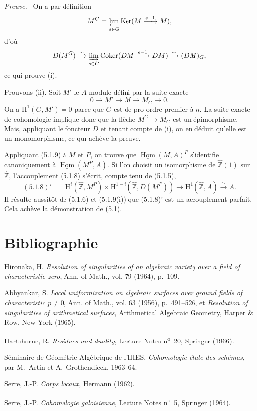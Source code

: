 \documentclass[11pt]{article}
\newenvironment{prooftext}[1][Proof]{\par\noindent\emph{#1.}\ }{\par\medskip}
\renewcommand{\H}{\mathrm{H}}
\DeclareMathOperator{\Hom}{Hom}
\newcommand{\Z}{\mathbb{Z}}
\providecommand{\Ker}{\operatorname{Ker}}
\providecommand{\Coker}{\operatorname{Coker}}
\providecommand{\uHom}{\underline{\Hom}}
\providecommand{\Hom}{\operatorname{Hom}}
\providecommand{\Ker}{\operatorname{Ker}}
\providecommand{\Coker}{\operatorname{Coker}}
\providecommand{\Ker}{\operatorname{Ker}}
\providecommand{\Coker}{\operatorname{Coker}}
\providecommand{\Z}{\mathbb Z}
\providecommand{\Hom}{\operatorname{Hom}}
\begin{document}
\begin{prooftext}[Preuve]
On a par définition
\[
M^G=\varprojlim_{s\in G}\Ker(M\xrightarrow{s-1}M),
\]
d'où
\[
D(M^G)\xrightarrow{\sim}\varinjlim_{s\in G}\Coker(DM\xrightarrow{s-1}DM)\xrightarrow{\sim}(DM)_G,
\]
ce qui prouve (i).

Prouvons (ii). Soit $M'$ le $A$-module défini par la suite exacte
\[
0\longrightarrow M'\longrightarrow M\longrightarrow M_G\longrightarrow0.
\]
On a $\H^1(G,M')=0$ parce que $G$ est de pro-ordre premier à $n$. La suite exacte de cohomologie implique donc que la flèche $M^G\to M_G$ est un épimorphisme. Mais, appliquant le foncteur $D$ et tenant compte de (i), on en déduit qu'elle est un monomorphisme, ce qui achève la preuve.
\end{prooftext}

Appliquant (5.1.9) à $M$ et $P$, on trouve que $\uHom(M,A)^P$ s'identifie canoniquement à $\uHom(M^P,A)$. Si l'on choisit un isomorphisme de $\widehat{\Z}(1)$ sur $\widehat{\Z}$, l'accouplement (5.1.8) s'écrit, compte tenu de (5.1.5),
\[
(5.1.8)'\qquad \H^i(\widehat{\Z},M^P)\times\H^{1-i}(\widehat{\Z},D(M^P))\longrightarrow\H^1(\widehat{\Z},A)\xrightarrow{\sim}A.
\]
Il résulte aussitôt de (5.1.6) et (5.1.9(i)) que (5.1.8)' est un accouplement parfait. Cela achève la démonstration de (5.1).

\section*{Bibliographie}

\begin{description}[leftmargin=2.5cm,style=nextline]
\item[{[2]}] Hironaka, H. \emph{Resolution of singularities of an algebraic variety over a field of characteristic zero}, Ann. of Math., vol. 79 (1964), p.~109.
\item[{[1]}] Abhyankar, S. \emph{Local uniformization on algebraic surfaces over ground fields of characteristic $p\ne0$}, Ann. of Math., vol. 63 (1956), p.~491--526, et \emph{Resolution of singularities of arithmetical surfaces}, Arithmetical Algebraic Geometry, Harper \& Row, New York (1965).
\item[{[H]}] Hartshorne, R. \emph{Residues and duality}, Lecture Notes n\textsuperscript{o}~20, Springer (1966).
\item[{[SGAA]}] Séminaire de Géométrie Algébrique de l'IHES, \emph{Cohomologie étale des schémas}, par M.~Artin et A.~Grothendieck, 1963--64.
\item[{[CL]}] Serre, J.-P. \emph{Corps locaux}, Hermann (1962).
\item[{[CG]}] Serre, J.-P. \emph{Cohomologie galoisienne}, Lecture Notes n\textsuperscript{o}~5, Springer (1964).
\end{description}
\end{document}
